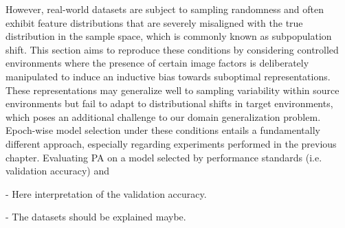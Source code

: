 However, real-world datasets are subject to sampling randomness and often exhibit feature
distributions that are severely misaligned with the true distribution in the sample space, 
which is commonly known as subpopulation shift. This section aims to reproduce these conditions 
by considering controlled environments where the presence of certain image factors is deliberately 
manipulated to induce an inductive bias towards suboptimal representations. These representations 
may generalize well to sampling variability within source environments but fail to adapt to 
distributional shifts in target environments, which poses an additional challenge to
our domain generalization problem. \\

Epoch-wise model selection under these conditions entails a fundamentally different approach,
especially regarding experiments performed in the previous chapter. Evaluating PA on a model
selected by performance standards (i.e. validation accuracy) and 

- Here interpretation of the validation accuracy.

- The datasets should be explained maybe. \\


